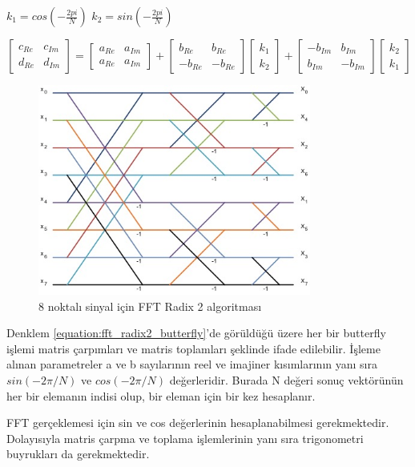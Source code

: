 $k_{1} = cos(-\frac{2pi}{N})$  $k_{2} = sin(-\frac{2pi}{N})$ \par
\begin{equation} \label{equation:fft_radix2_butterfly}
  \begin{bmatrix}
    c_{Re} & c_{Im} \\[0.3em]
    d_{Re} & d_{Im} 
  \end{bmatrix} 
  = 
  \begin{bmatrix}
    a_{Re} & a_{Im} \\[0.3em]
    a_{Re} & a_{Im} 
  \end{bmatrix}
  +
  \begin{bmatrix}
    b_{Re} & b_{Re} \\[0.3em]
    -b_{Re} & -b_{Re} 
  \end{bmatrix}
  \begin{bmatrix}
    k_{1} \\[0.3em]
    k_{2} 
  \end{bmatrix}
  +
  \begin{bmatrix}
    -b_{Im} & b_{Im} \\[0.3em]
    b_{Im} & -b_{Im} 
  \end{bmatrix}
  \begin{bmatrix}
    k_{2} \\[0.3em]
    k_{1} 
  \end{bmatrix}
\end{equation} 

\begin{figure}[h]
\centering
\shorthandoff{=}
\includegraphics[width=0.8\textwidth]{gorsel/fft_radix2_8p.jpg}
\shorthandoff{=}
\caption{8 noktalı sinyal için FFT Radix 2 algoritması}
\label{image:fft_radix2_8p}
\end{figure}
Denklem \ref{equation:fft_radix2_butterfly}'de görüldüğü üzere her bir butterfly işlemi matris çarpımları ve matris toplamları şeklinde ifade edilebilir. İşleme alınan parametreler a ve b sayılarının reel ve imajiner kısımlarının yanı sıra $sin(-2\pi/N)$ ve $cos(-2\pi/N)$ değerleridir. Burada N değeri sonuç vektörünün her bir elemanın indisi olup, bir eleman için bir kez hesaplanır. \par
FFT gerçeklemesi için sin ve cos değerlerinin hesaplanabilmesi gerekmektedir. Dolayısıyla matris çarpma ve toplama işlemlerinin yanı sıra trigonometri buyrukları da gerekmektedir.

